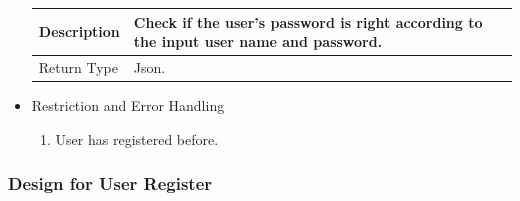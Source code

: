 \documentclass[16pt]{scrreprt}
\begin{document}
\begin{itemize}
\begin{center}
\begin{tabular}{p{5cm}p{10cm}}
        \hline
        Description & Check if the user's password is right according to the input user name and password.\\
        \hline
        Return Type & Json.\\
        \hline
    \end{tabular}
\end{center}
\item Restriction and Error Handling\\
\begin{enumerate}
	\item User has registered before.
\end{enumerate} 
\end{itemize}

\subsubsection{Design for User Register}
\end{document}
